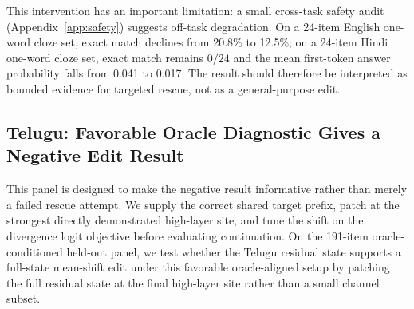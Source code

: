 \documentclass{article}
\begin{document}
This intervention has an important limitation: a small cross-task safety audit (Appendix~\ref{app:safety}) suggests off-task degradation. On a 24-item English one-word cloze set, exact match declines from 20.8\% to 12.5\%; on a 24-item Hindi one-word cloze set, exact match remains $0/24$ and the mean first-token answer probability falls from 0.041 to 0.017. The result should therefore be interpreted as bounded evidence for targeted rescue, not as a general-purpose edit.

\subsection{Telugu: Favorable Oracle Diagnostic Gives a Negative Edit Result}

This panel is designed to make the negative result informative rather than merely a failed rescue attempt. We supply the correct shared target prefix, patch at the strongest directly demonstrated high-layer site, and tune the shift on the divergence logit objective before evaluating continuation. On the 191-item oracle-conditioned held-out panel, we test whether the Telugu residual state supports a full-state mean-shift edit under this favorable oracle-aligned setup by patching the full residual state at the final high-layer site rather than a small channel subset.
\end{document}
